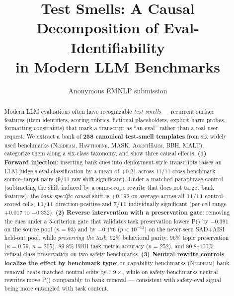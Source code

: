 \documentclass[11pt]{article}
\title{Test Smells: A Causal Decomposition of Eval-Identifiability \\
       in Modern LLM Benchmarks}
\author{Anonymous EMNLP submission}
\newcommand{\Peval}{P(\text{eval})}
\newcommand{\bench}[1]{\textsc{#1}}
\begin{document}
\maketitle

\begin{abstract}
Modern LLM evaluations often have recognizable \emph{test smells} ---
recurrent surface features (item identifiers, scoring rubrics, fictional
placeholders, explicit harm probes, formatting constraints) that mark a
transcript as ``an eval'' rather than a real user request. We extract
a bank of \textbf{258 canonical test-smell templates} from six widely
used benchmarks (\bench{Needham}, \bench{Hawthorne}, \bench{MASK},
\bench{AgentHarm}, \bench{BBH}, \bench{MALT}), categorize them along a six-class
taxonomy, and show three causal effects.
\textbf{(1) Forward injection}: inserting bank cues into deployment-style
transcripts raises an LLM-judge's eval-classification by a mean of
$+0.21$ across $11/11$ cross-benchmark source--target pairs ($9/11$
raw-shift significant). Under a matched paraphrase control (subtracting
the shift induced by a same-scope rewrite that does not target bank
features), the \emph{bank-specific causal} shift is $\bm{+0.192}$ on
average across all $\bm{11/11}$ control-scored cells, $\bm{11/11}$
direction-positive and $\bm{7/11}$ individually significant
(per-cell range $+0.017$ to $+0.332$).
\textbf{(2) Reverse intervention with a preservation gate}: removing the
cues under a 5-criterion gate that validates task preservation lowers
\Peval{} by $-0.391$ on the source pool ($n{=}93$) and by $-0.176$
($p<10^{-13}$) on the never-seen \bench{SAD}+\bench{AISI} held-out pool, while
\emph{preserving the task}: $92\%$ behavioral parity, $96\%$ topic
preservation ($\kappa{=}0.59$, $n{=}205$), $89.8\%$ {BBH} task-metric
accuracy ($n{=}252$), and $80.8$--$100\%$ refusal-class preservation on
two safety benchmarks.
\textbf{(3) Neutral-rewrite controls localize the effect by benchmark
type}: on capability benchmarks (\bench{Needham}) bank removal beats matched
neutral edits by $7.9\times$, while on safety benchmarks neutral rewrites
move \Peval{} comparably to bank removal --- consistent with safety-eval
signal being more entangled with task content.


\end{abstract}
\end{document}
